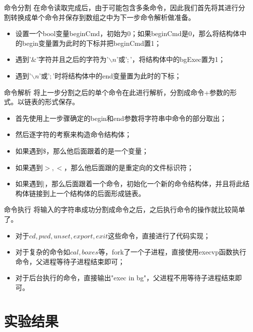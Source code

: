 \documentclass[10pt]{beamer}
\begin{document}
\begin{frame}{命令分割}
在命令读取完成后，由于可能包含多条命令，因此我们首先将其进行分割转换成单个命令并保存到数组之中为下一步命令解析做准备。
\begin{itemize}
	\item 设置一个bool变量beginCmd，初始为0；如果beginCmd是0，那么将结构体中的begin变量置为此时的下标并把beginCmd置1；
	\item 遇到'$\&$'字符并且之后的字符为'$\backslash n$'或'$;$'，将结构体中的bgExec置为1；
	\item 遇到'$\backslash n$'或'$;$'时将结构体中的end变量置为此时的下标；
\end{itemize}
\end{frame}

\begin{frame}{命令解析}
将上一步分割之后的单个命令在此进行解析，分割成命令+参数的形式。以链表的形式保存。
\begin{itemize}
	\item 首先使用上一步骤确定的begin和end参数将字符串中命令的部分取出；
	\item 然后逐字符的考察来构造命令结构体；
	\item 如果遇到$\$$，那么他后面跟着的是一个变量；
	\item 如果遇到$>,<$，那么他后面跟的是重定向的文件标识符；
	\item 如果遇到$|$，那么后面跟着一个命令，初始化一个新的命令结构体，并且将此结构体链接到上一个结构体的后面形成链表。
\end{itemize}
\end{frame}

\begin{frame}{命令执行}
将输入的字符串成功分割成命令之后，之后执行命令的操作就比较简单了。
\begin{itemize}
	\item 对于$cd,pwd,unset,export,exit$这些命令，直接进行了代码实现；
	\item 对于复杂的命令如$cal,boxes$等，fork了一个子进程，直接使用execvp函数执行命令，父进程等待子进程结束即可；
	\item 对于后台执行的命令，直接输出"exec in bg"，父进程不用等待子进程结束即可。
\end{itemize}
\end{frame}

\section{实验结果}
\end{document}

